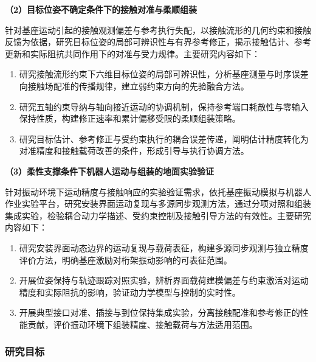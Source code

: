 \documentclass[UTF8,a4paper,zihao=-4,fontset=fandol]{ctexart}
\newcommand{\topic}[1]{\par\Needspace{4\baselineskip}\addvspace{0.5em}\noindent\textbf{#1}\par\nobreak}
\newcommand{\rev}[1]{{\color{red}#1}}
\begin{document}
\topic{（2）目标位姿不确定条件下的接触对准与柔顺组装}

\rev{针对}基座运动\rev{引起的}接触观测\rev{偏差}与参考\rev{执行失配，以接触流形的几何约束}和接触\rev{反馈}为\rev{依据}，研究\rev{目标位姿的局部可辨识性}与\rev{有界}参考修正\rev{，揭示接触估计、参考更新和实际阻抗共同作用下}的\rev{对准}与\rev{受力规律}。主要研究内容如下：
\begin{enumerate}[label=\arabic*)]
 \item \rev{研究}接触\rev{流形约束下六维目标位姿的局部可辨识性}，分析基座测量\rev{与时序}误差\rev{向}接触\rev{场}配准的\rev{传播规律}，\rev{建立弱}约束\rev{方向}的\rev{先验融合方法}。
 \item \rev{研究}五轴约束导纳\rev{与轴向接近运动的协调机制}，\rev{保持参考端口耗散性与}零输入保持性质，\rev{构建}修正速率\rev{和累计}偏移\rev{受限}的\rev{柔顺组装策略}。
 \item \rev{研究}目标估计\rev{、参考修正与受约束执行的耦合误差传递，阐明估计}精度\rev{转化为对准精度和}接触载荷\rev{改善的条件}，\rev{形成}引导\rev{与执行协调方法}。
\end{enumerate}

\topic{（3）柔性支撑条件下机器人运动与组装的地面实验验证}

\rev{针对振动环境下运动精度与接触响应的实验验证需求，}依托基座振动模拟与机器人作业实验平台，\rev{研究安装界面}运动\rev{复现与多源}同步\rev{观测方法}，通过\rev{分项对照和组装集成实验}，\rev{检验耦合}动力学描述\rev{、受约束}控制\rev{及接触引导}方法\rev{的有效性}。主要研究内容如下：
\begin{enumerate}[label=\arabic*)]
 \item \rev{研究安装界面动态边界的运动复现}与\rev{载荷表征，构建多源同步观测}与\rev{独立精度}评价方法\rev{，明确基座激励对桁架振动影响的可表征范围}。
 \item 开展位姿保持与轨迹跟踪\rev{对照实验}，\rev{辨析界面载荷建模偏差}与\rev{约束激活对}运动精度\rev{和}实际阻抗\rev{的影响，验证动力学模型}与\rev{控制的实时性}。
 \item 开展典型接口对准、插接\rev{与}到位保持\rev{集成实验}，\rev{分离}接触配准\rev{和}参考修正的\rev{性能贡献}，评价振动环境下\rev{组装精度、接触载荷}与\rev{方法适用范围}。
\end{enumerate}

\subsubsection{研究目标}
\end{document}
